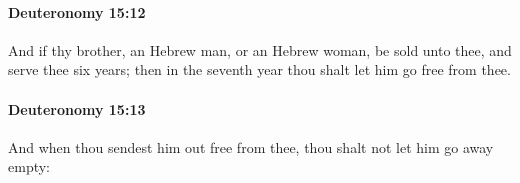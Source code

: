 		\paragraph{Deuteronomy 15:12} %
			\label{DEUTERONOMY-15-12}

			And if thy brother, an Hebrew man, or an Hebrew woman, be sold unto thee, and serve thee six years; then in the seventh year thou shalt let him go free from thee.


		\paragraph{Deuteronomy 15:13} %
			\label{DEUTERONOMY-15-13}

			And when thou sendest him out free from thee, thou shalt not let him go away empty:


